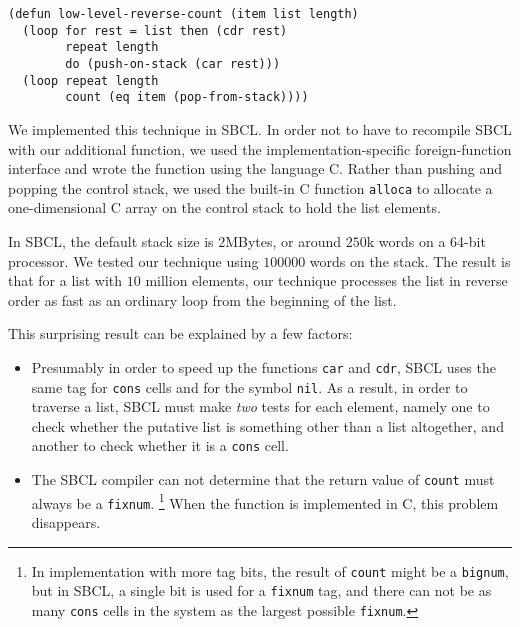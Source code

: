 {\small\begin{verbatim}
(defun low-level-reverse-count (item list length)
  (loop for rest = list then (cdr rest)
        repeat length
        do (push-on-stack (car rest)))
  (loop repeat length
        count (eq item (pop-from-stack))))
\end{verbatim}}

We implemented this technique in SBCL.  In order not to have to
recompile SBCL with our additional function, we used the
implementation-specific foreign-function interface and wrote the
function using the language C.  Rather than pushing and popping the
control stack, we used the built-in C function \texttt{alloca} to
allocate a one-dimensional C array on the control stack to hold the
list elements.

In SBCL, the default stack size is $2$MBytes, or around $250$k words
on a 64-bit processor.  We tested our technique using $100000$ words
on the stack.  The result is that for a list with $10$ million
elements, our technique processes the list in reverse order as fast as
an ordinary loop from the beginning of the list.

This surprising result can be explained by a few factors:

\begin{itemize}
\item Presumably in order to speed up the functions \texttt{car} and
  \texttt{cdr}, SBCL uses the same tag for \texttt{cons} cells and for
  the symbol \texttt{nil}.  As a result, in order to traverse a list,
  SBCL must make \emph{two} tests for each element, namely one to
  check whether the putative list is something other than a list
  altogether, and another to check whether it is a \texttt{cons}
  cell.
\item The SBCL compiler can not determine that the return value of
  \texttt{count} must always be a \texttt{fixnum}.%
  \footnote{In implementation with more tag bits, the result of
    \texttt{count} might be a \texttt{bignum}, but in SBCL, a single
    bit is used for a \texttt{fixnum} tag, and there can not be as
    many \texttt{cons} cells in the system as the largest possible
    \texttt{fixnum}.}
  When the function is implemented in C, this problem disappears.
\end{itemize}
